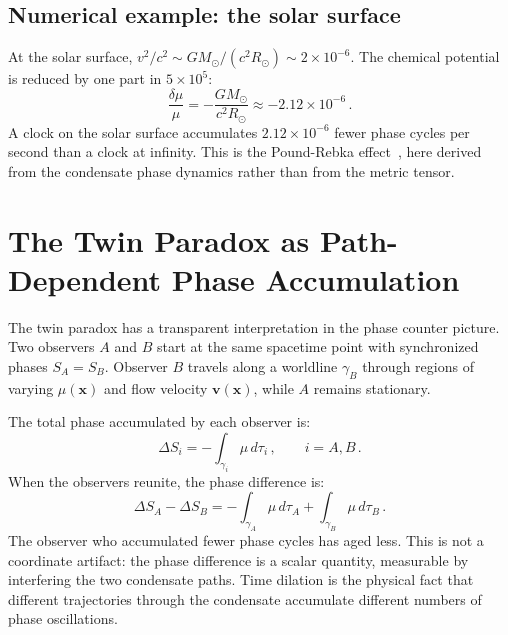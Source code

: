 \documentclass[12pt, a4paper]{article}
\begin{document}
\subsection{Numerical example: the solar surface}

At the solar surface, $v^2/c^2 \sim GM_\odot/(c^2
R_\odot) \sim 2 \times 10^{-6}$. The chemical
potential is reduced by one part in $5 \times 10^5$:
\begin{equation}
    \frac{\delta\mu}{\mu}
    = -\frac{GM_\odot}{c^2 R_\odot}
    \approx -2.12 \times 10^{-6}\,.
\end{equation}
A clock on the solar surface accumulates
$2.12 \times 10^{-6}$ fewer phase cycles per second
than a clock at infinity. This is the Pound-Rebka
effect~\cite{pound_1960}, here derived from the
condensate phase dynamics rather than from the
metric tensor.


\section{The Twin Paradox as Path-Dependent Phase
Accumulation}
\label{sec:twin}

The twin paradox has a transparent interpretation in
the phase counter picture. Two observers $A$ and $B$
start at the same spacetime point with synchronized
phases $S_A = S_B$. Observer $B$ travels along a
worldline $\gamma_B$ through regions of varying
$\mu(\mathbf{x})$ and flow velocity
$\mathbf{v}(\mathbf{x})$, while $A$ remains
stationary.

The total phase accumulated by each observer is:
\begin{equation}
    \Delta S_i = -\int_{\gamma_i} \mu\,d\tau_i\,,
    \qquad i = A, B\,.
\label{eq:phase_path}
\end{equation}
When the observers reunite, the phase difference is:
\begin{equation}
    \Delta S_A - \Delta S_B
    = -\int_{\gamma_A}\!\mu\,d\tau_A
    + \int_{\gamma_B}\!\mu\,d\tau_B\,.
\label{eq:twin_phase}
\end{equation}
The observer who accumulated fewer phase cycles has
aged less. This is not a coordinate artifact: the
phase difference is a scalar quantity, measurable
by interfering the two condensate paths. Time
dilation is the physical fact that different
trajectories through the condensate accumulate
different numbers of phase oscillations.
\end{document}
